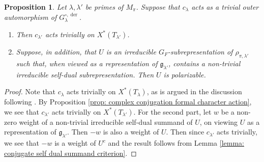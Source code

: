 \documentclass{amsart}
\newtheorem{proposition}[theorem]{Proposition}
\theoremstyle{definition}
\numberwithin{equation}{section} %
\newcommand{\der}{\operatorname{der}}
\newcommand{\mf}[1]{\mathfrak{#1}}
\begin{document}
\begin{proposition}\label{prop: conjugate self-duality criteria from single prime}
Let $\lambda,\lambda'$ be primes of $M_\pi$. Suppose that $c_{\lambda}$ acts as a trivial outer automorphism of $G_\lambda^{\circ,\der}$.
\begin{enumerate}
    \item Then $c_{\lambda'}$ acts trivially on $X^*(T_{\lambda'})$.
    \item Suppose, in addition, that $U$ is an irreducible $G_F$-subrepresentation of $\rho_{\pi,\lambda'}$ such that, when viewed as a representation of $\mf{g}_{\lambda'}$, contains a non-trivial irreducible self-dual subrepresentation.
Then $U$ is polarizable.
\end{enumerate}
\end{proposition}
\begin{proof}
Note that $c_{\lambda}$ acts trivially on $X^*(T_{\lambda})$, as is argued in the discussion following \cite[Proposition 21]{Xia19}.
By Proposition \ref{prop: complex conjugation formal character action}, we see that $c_{\lambda'}$ acts trivially on $X^*(T_{\lambda'})$.
For the second part, let $w$ be a non-zero weight of a non-trivial irreducible self-dual summand of $U$, on viewing $U$ as a representation of $\mf{g}_{\lambda'}$.
Then $-w$ is also a weight of $U$.
Then since $c_{\lambda'}$ acts trivially, we see that $-w$ is a weight of $U^c$ and the result follows from Lemma \ref{lemma: conjugate self dual summand criterion}.
\end{proof}
\end{document}
